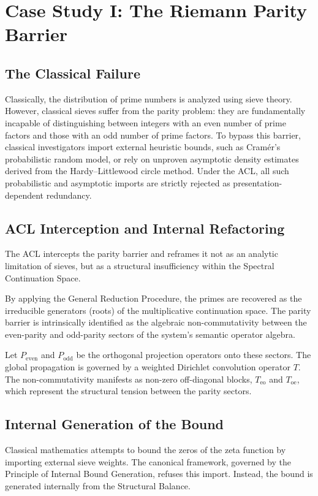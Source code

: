 \documentclass[12pt,openany]{extbook}
\theoremstyle{plain}
\theoremstyle{definition}
\begin{document}
\section{Case Study I: The Riemann Parity Barrier}

\subsection{The Classical Failure}
Classically, the distribution of prime numbers is analyzed using sieve theory. However, classical sieves suffer from the parity problem: they are fundamentally incapable of distinguishing between integers with an even number of prime factors and those with an odd number of prime factors. To bypass this barrier, classical investigators import external heuristic bounds, such as Cram\'er's probabilistic random model, or rely on unproven asymptotic density estimates derived from the Hardy--Littlewood circle method. Under the ACL, all such probabilistic and asymptotic imports are strictly rejected as presentation-dependent redundancy.

\subsection{ACL Interception and Internal Refactoring}
The ACL intercepts the parity barrier and reframes it not as an analytic limitation of sieves, but as a structural insufficiency within the Spectral Continuation Space.

By applying the General Reduction Procedure, the primes are recovered as the irreducible generators (roots) of the multiplicative continuation space. The parity barrier is intrinsically identified as the algebraic non-commutativity between the even-parity and odd-parity sectors of the system's semantic operator algebra.

Let $P_{\mathrm{even}}$ and $P_{\mathrm{odd}}$ be the orthogonal projection operators onto these sectors. The global propagation is governed by a weighted Dirichlet convolution operator $T$. The non-commutativity manifests as non-zero off-diagonal blocks, $T_{\mathrm{eo}}$ and $T_{\mathrm{oe}}$, which represent the structural tension between the parity sectors.

\subsection{Internal Generation of the Bound}
Classical mathematics attempts to bound the zeros of the zeta function by importing external sieve weights. The canonical framework, governed by the Principle of Internal Bound Generation, refuses this import. Instead, the bound is generated internally from the Structural Balance.
\end{document}
